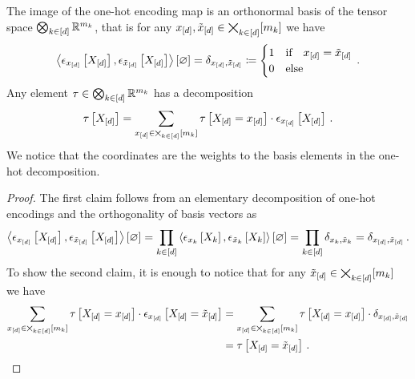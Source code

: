 \begin{lemma}%
    \label{lem:tensorBasisDecomposition}
    The image of the one-hot encoding map is an orthonormal basis of the tensor space $\bigotimes_{k\in[d]} \mathbb{R}^{m_{k}}$, that is for any $x_{[d]},\tilde{x}_{[d]}\in\bigtimes_{k\in[d]}[m_{k}]$ we have
    \begin{align*}
        \left\langle \epsilon_{x_{[d]}}\left[X_{[d]}\right],\epsilon_{\tilde{x}_{[d]}}\left[X_{[d]}\right]\right\rangle \left[ \varnothing \right]
        = \delta_{x_{[d]},\tilde{x}_{[d]}}
        \coloneqq
        \begin{cases}
            1 & \text{if} \quad x_{[d]}=\tilde{x}_{[d]} \\
            0 & \text{else}
        \end{cases} \, .
    \end{align*}
    Any element $\tau\in\bigotimes_{k\in[d]} \mathbb{R}^{m_{k}}$ has a decomposition
    \begin{align*}
        \tau\left[X_{[d]}\right]
        = \sum_{x_{[d]}\in\bigtimes_{k\in[d]}[m_{k}]} \tau\left[X_{[d]}=x_{[d]}\right] \cdot \epsilon_{x_{[d]}}\left[X_{[d]}\right] \, .
    \end{align*}
    We notice that the coordinates are the weights to the basis elements in the one-hot decomposition.
\end{lemma}
\begin{proof}
    The first claim follows from an elementary decomposition of one-hot encodings and the orthogonality of basis vectors as
    \begin{align*}
        \left\langle \epsilon_{x_{[d]}}\left[X_{[d]}\right],\epsilon_{\tilde{x}_{[d]}}\left[X_{[d]}\right]\right\rangle \left[ \varnothing \right]
        = \prod_{k\in[d]} \left\langle \epsilon_{x_{k}}\left[X_{k}\right],\epsilon_{\tilde{x}_{k}}\left[X_{k}\right]\right\rangle \left[ \varnothing \right]
        = \prod_{k\in[d]} \delta_{x_{k},\tilde{x}_{k}}
        = \delta_{x_{[d]},\tilde{x}_{[d]}} \, .
    \end{align*}
    To show the second claim, it is enough to notice that for any $\tilde{x}_{[d]}\in\bigtimes_{k\in[d]}[m_{k}]$ we have
    \begin{align*}
        \sum_{x_{[d]}\in\bigtimes_{k\in[d]}[m_{k}]} \tau\left[X_{[d]}=x_{[d]}\right] \cdot \epsilon_{x_{[d]}}\left[X_{[d]}=\tilde{x}_{[d]}\right]
        &= \sum_{x_{[d]}\in\bigtimes_{k\in[d]}[m_{k}]} \tau\left[X_{[d]}=x_{[d]}\right] \cdot \delta_{x_{[d]},\tilde{x}_{[d]}} \\
        &=   \tau\left[X_{[d]}=\tilde{x}_{[d]}\right] \, .
    \end{align*}
\end{proof}

